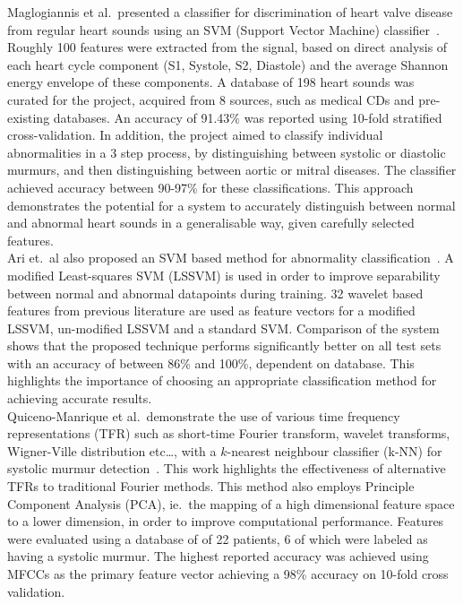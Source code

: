 \documentclass[titlepage, 12pt]{scrartcl} \usepackage{enumitem}
\begin{document}
Maglogiannis et al.\ presented a classifier for discrimination of heart valve
disease from regular heart sounds using an SVM (Support Vector Machine)
classifier~\parencite{Maglogiannis2009}.  Roughly 100 features were extracted
from the signal, based on direct analysis of each heart cycle component (S1,
Systole, S2, Diastole) and the average Shannon energy envelope of these
components.  A database of 198 heart sounds was curated for the project,
acquired from 8 sources, such as medical CDs and pre-existing databases.  An
accuracy of 91.43\% was reported using 10-fold stratified cross-validation.  In
addition, the project aimed to classify individual abnormalities in a 3 step
process, by distinguishing between systolic or diastolic murmurs, and then
distinguishing between aortic or mitral diseases. The classifier achieved
accuracy between 90-97\% for these classifications. This approach demonstrates
the potential for a system to accurately distinguish between normal and
abnormal heart sounds in a generalisable way, given carefully selected
features.\\

Ari et.\ al also proposed an SVM based method for abnormality
classification~\parencite{Ari2010}. A modified Least-squares SVM (LSSVM) is
used in order to improve separability between normal and abnormal datapoints
during training. 32 wavelet based features from previous literature are used as
feature vectors for a modified LSSVM, un-modified LSSVM and a standard SVM.
Comparison of the system shows that the proposed technique performs
significantly better on all test sets with an accuracy of between 86\% and
100\%, dependent on database. This highlights the importance of choosing an
appropriate classification method for achieving accurate results.\\

Quiceno-Manrique et al.\ demonstrate the use of various time frequency
representations (TFR) such as short-time Fourier transform, wavelet transforms,
Wigner-Ville distribution etc\ldots, with a $k$-nearest neighbour classifier
(k-NN) for systolic murmur detection~\parencite{Quiceno-Manrique2010a}. This
work highlights the effectiveness of alternative TFRs to traditional Fourier
methods. This method also employs Principle Component Analysis (PCA), ie.\ the
mapping of a high dimensional feature space to a lower dimension, in order to
improve computational performance. Features were evaluated using a database
of of 22 patients, 6 of which were labeled as having a systolic murmur. The
highest reported accuracy was achieved using MFCCs as the primary feature
vector achieving a 98\% accuracy on 10-fold cross validation.\\
\end{document}
